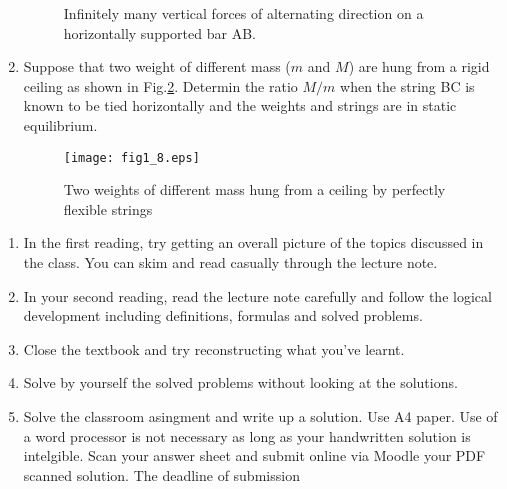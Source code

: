 \documentclass[10pt,a4j]{article}
\begin{document}
\begin{enumerate}
\begin{figure}[h]
\begin{center}
	\end{center}
	\caption{Infinitely many vertical forces of alternating direction on 
	a horizontally supported bar AB.}
	\label{fig:fig1_7}
	\end{figure}
\item
	Suppose that two weight of different mass ($m$ and $M$) are hung from 
	a rigid ceiling as shown in Fig.\ref{fig:fig1_8}.
	Determin the ratio $M/m$ when the string BC is known to be tied horizontally 
	and the weights and strings are in static equilibrium.
	\begin{figure}[h]
		\begin{center}
		\texttt{[image: fig1\_8.eps]} 
		\end{center}
		\caption{Two weights of different mass hung from a ceiling by perfectly flexible strings} 
		\label{fig:fig1_8}
	\end{figure}
\end{enumerate}
%
\begin{enumerate}
\item
In the first reading, try getting an overall picture of the topics discussed in the class.
You can skim and read casually through the lecture note.
\item
In your second reading, read the lecture note carefully and follow the logical 
	development including definitions, formulas and solved problems.
\item
Close the textbook and try reconstructing what you've learnt.
\item
Solve by yourself the solved problems without looking at the solutions.
\item
Solve the classroom asingment and write up a solution. 
Use A4 paper. Use of a word processor is not necessary as long as your 
handwritten solution is intelgible. 
Scan your answer sheet and submit online via Moodle your PDF scanned solution.
The deadline of submission 
\end{enumerate}
\end{document}

